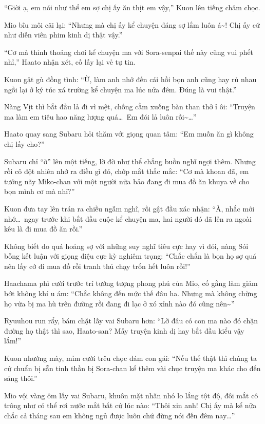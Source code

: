 \documentclass[../main.tex]{subfiles}
\begin{document}
``Giời ạ, em nói như thể em sợ chị ấy ăn thịt em vậy,'' Kuon lên tiếng châm chọc.

Mio bĩu môi cãi lại: ``Nhưng mà chị ấy kể chuyện đáng sợ lắm luôn á\~{}! Chị ấy cứ như diễn viên phim kinh dị thật vậy.''

``Cơ mà thỉnh thoảng chơi kể chuyện ma với Sora-senpai thế này cũng vui phết nhỉ,'' Haato nhận xét, cố lấy lại vẻ tự tin.

Kuon gật gù đồng tình: ``Ừ, làm anh nhớ đến cái hồi bọn anh cũng hay rủ nhau ngồi lại ở ký túc xá trường kể chuyện ma lúc nửa đêm. Đúng là vui thật.''

Nàng Vịt thì bắt đầu lả đi vì mệt, chống cằm xuống bàn than thở ỉ ôi: ``Truyện ma làm em tiêu hao năng lượng quá\dots\ Em đói lả luôn rồi\~{}\dots''

Haato quay sang Subaru hỏi thăm với giọng quan tâm: ``Em muốn ăn gì không chị lấy cho?''

Subaru chỉ ``ờ'' lên một tiếng, lờ đờ như thể chẳng buồn nghĩ ngợi thêm. Nhưng rồi cô đột nhiên nhớ ra điều gì đó, chớp mắt thắc mắc: ``Cơ mà khoan đã, em tưởng nãy Miko-chan với một người nữa bảo đang đi mua đồ ăn khuya về cho bọn mình cơ mà nhỉ?''

Kuon đưa tay lên trán ra chiều ngẫm nghĩ, rồi gật đầu xác nhận: ``À, nhắc mới nhớ\dots\ ngay trước khi bắt đầu cuộc kể chuyện ma, hai người đó đã lẻn ra ngoài kêu là đi mua đồ ăn rồi.''

Không biết do quá hoảng sợ với những suy nghĩ tiêu cực hay vì đói, nàng Sói bỗng kết luận với giọng điệu cực kỳ nghiêm trọng: ``Chắc chắn là bọn họ sợ quá nên lấy cớ đi mua đồ rồi tranh thủ chạy trốn hết luôn rồi!''

Haachama phì cười trước trí tưởng tượng phong phú của Mio, cố gắng làm giảm bớt không khí u ám: ``Chắc không đến mức thế đâu ha. Nhưng mà không chừng họ vừa bị ma hù trên đường rồi đang đi lạc ở xó xỉnh nào đó cũng nên\~{}''

Ryuuhou run rẩy, bám chặt lấy vai Subaru hơn: ``Lỡ đâu có con ma nào đó chặn đường họ thật thì sao, Haato-san? Mấy truyện kinh dị hay bắt đầu kiểu vậy lắm!''

Kuon nhướng mày, mỉm cười trêu chọc đám con gái: ``Nếu thế thật thì chúng ta cứ chuẩn bị sẵn tinh thần bị Sora-chan kể thêm vài chục truyện ma khác cho đến sáng thôi.''

Mio vội vàng ôm lấy vai Subaru, khuôn mặt nhăn nhó lo lắng tột độ, đôi mắt cô trông như có thể rơi nước mắt bất cứ lúc nào: ``Thôi xin anh! Chị ấy mà kể nữa chắc cả tháng sau em không ngủ được luôn chứ đừng nói đến đêm nay\dots''
\end{document}

